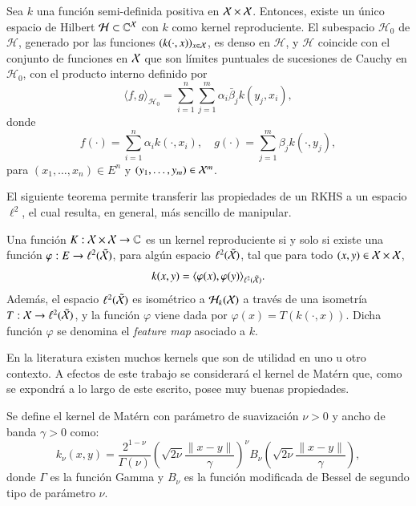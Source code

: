 \begin{teo}
Sea \( k \) una función semi-definida positiva en \( \mathcal{X} \times \mathcal{X} \). Entonces, existe un único espacio de Hilbert \( \mathcal{H} \subset \mathbb{C}^{\mathcal{X}} \) con \( k \) como kernel reproduciente. El subespacio \( \mathcal{H}_0 \) de \( \mathcal{H} \), generado por las funciones \( (k(\cdot, x))_{x \in \mathcal{X}} \), es denso en \( \mathcal{H} \), y \( \mathcal{H} \) coincide con el conjunto de funciones en \( \mathcal{X} \) que son límites puntuales de sucesiones de Cauchy en \( \mathcal{H}_0 \), con el producto interno definido por
\[
\langle f, g \rangle_{\mathcal{H}_0} = \sum_{i=1}^n \sum_{j=1}^m \alpha_i \bar{\beta}_j k(y_j, x_i),
\]
donde
\[
f(\cdot) = \sum_{i=1}^n \alpha_i k(\cdot, x_i), \quad g(\cdot) = \sum_{j=1}^m \beta_j k(\cdot, y_j),
\]
para \( (x_1, \dots, x_n) \in E^n \) y \( (y_1, \dots, y_m) \in \mathcal{X}^m \).
\end{teo}

\noindent El siguiente teorema permite transferir las propiedades de un RKHS a un espacio \( \ell^2 \), el cual resulta, en general, más sencillo de manipular.

\begin{teo}
Una función \( K: \mathcal{X} \times \mathcal{X} \to \mathbb{C} \) es un kernel reproduciente si y solo si existe una función \( \varphi: E \to \ell^2 (\Tilde{\mathcal{X}}) \), para algún espacio \( \ell^2(\Tilde{\mathcal{X}}) \), tal que para todo \( (x, y) \in \mathcal{X} \times \mathcal{X} \),
\[
k(x, y)= \langle \varphi(x), \varphi(y) \rangle_{\ell^2(\Tilde{\mathcal{X}})}.
\]
Además, el espacio \( \ell^2(\Tilde{\mathcal{X}}) \) es isométrico a \( \mathcal{H}_k(\mathcal{X}) \) a través de una isometría \( T: \mathcal{X} \to \ell^2(\Tilde{\mathcal{X}}) \), y la función \( \varphi \) viene dada por \( \varphi(x) = T(k(\cdot, x)) \). Dicha función \( \varphi \) se denomina el \textit{feature map} asociado a \( k \).
\end{teo}
En la literatura existen muchos kernels que son de utilidad en uno u otro contexto. A efectos de este trabajo se considerará el kernel de Matérn que, como se expondrá a lo largo de este escrito, posee muy buenas propiedades.
\begin{defn}
Se define el kernel de Matérn con parámetro de suavización \( \nu > 0 \) y ancho de banda \( \gamma > 0 \) como:
\[
k_{\nu}(x,y) = \frac{2^{1-\nu}}{\Gamma(\nu)} \left( \sqrt{2\nu} \frac{\|x-y\|}{\gamma} \right)^\nu B_\nu \left( \sqrt{2\nu} \frac{\|x-y\|}{\gamma} \right),
\]
donde \( \Gamma \) es la función Gamma y \( B_\nu \) es la función modificada de Bessel de segundo tipo de parámetro \( \nu \).

\end{defn}

